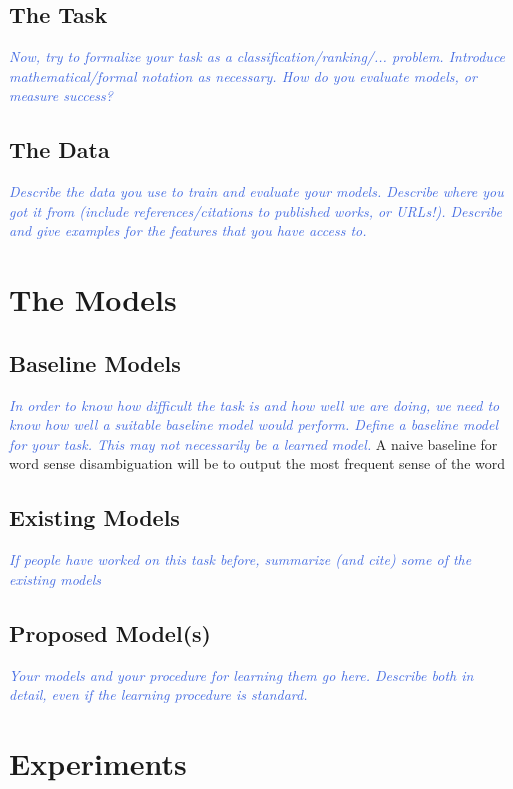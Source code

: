 \documentclass[11pt,letterpaper]{article}
\newcommand{\blue}[1]{\textcolor{RoyalBlue}{#1}}
\newcommand{\instructions}[1]{\blue{\textit{#1}}}
\begin{document}
\subsection{The Task}
\label{sec:task}
\instructions{Now, try to formalize your task as a classification/ranking/... problem. Introduce mathematical/formal notation as necessary. How do you evaluate models, or measure success?}

\subsection{The Data}
\label{sec:data}
\instructions{Describe the data you use to train and evaluate your models. Describe where you got it from (include references/citations to published works, or URLs!). Describe and give examples for the features that you have access to.} 


\section{The Models}
\label{sec:models}

\subsection{Baseline Models}
\label{sec:baseline-models}
\instructions{In order to know how difficult the task is and how well we are doing, we need to know how well a suitable baseline model would perform. Define a baseline model for your task. This may not necessarily be a learned model.}
A naive baseline for word sense disambiguation will be to output the most frequent sense of the word 

\subsection{Existing Models}
\label{sec:existing-models}
\instructions{If people have worked on this task before, summarize (and cite) some of the existing models} 

\subsection{Proposed Model(s)}
\label{sec:proposed-models}
\instructions{Your models and your procedure for learning them go here. Describe both in detail, even if the learning procedure is standard.}



\section{Experiments}
\label{sec:experiments}
\end{document}
